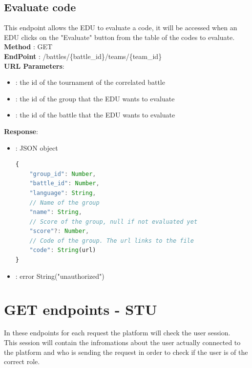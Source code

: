 \subsection*{Evaluate code}
This endpoint allows the EDU to evaluate a code, it will be accessed when an EDU clicks on the "Evaluate" button from the table of the codes to evaluate.\\
\textbf{Method} : GET \\
\textbf{EndPoint} : /battles/\{battle\_id\}/teams/\{team\_id\}     \\
\textbf{URL Parameters}:
\begin{itemize}
    \item {} : the id of the tournament of the correlated battle
    \item {}: the id of the group that the EDU wants to evaluate
    \item {}: the id of the battle that the EDU wants to evaluate
\end{itemize}
\textbf{Response}:
\begin{itemize}
    \item {} : JSON object
          \begin{lstlisting}[language=JavaScript, label={lst:jscode}, basicstyle=\ttfamily]
{
    "group_id": Number,
    "battle_id": Number,
    "language": String,
    // Name of the group
    "name": String,
    // Score of the group, null if not evaluated yet
    "score"?: Number,
    // Code of the group. The url links to the file
    "code": String(url)
}
    \end{lstlisting}
    \item {} : error String("unauthorized")
\end{itemize}

\section*{GET endpoints - STU}
In these endpoints for each request the platform will check the user session.\\ 
This session will contain the infromations about the user actually connected to the platform and who is sending the request in order to check if the user is of the correct role.

